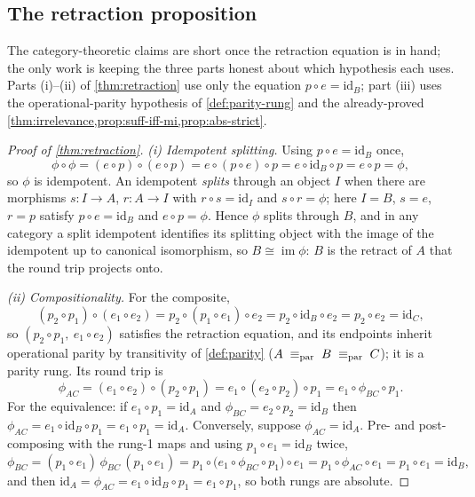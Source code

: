 \subsection{The retraction proposition}
\label{app:retraction}

The category-theoretic claims are short once the retraction equation is in
hand; the only work is keeping the three parts honest about which hypothesis
each uses. Parts (i)--(ii) of \cref{thm:retraction} use only the equation
$p\circ e=\mathrm{id}_B$; part (iii) uses the operational-parity hypothesis of
\cref{def:parity-rung} and the already-proved \cref{thm:irrelevance,prop:suff-iff-mi,prop:abs-strict}.

\begin{proof}[Proof of \cref{thm:retraction}]
\emph{(i) Idempotent splitting.} Using $p\circ e=\mathrm{id}_B$ once,
\[
  \phi\circ\phi
  = (e\circ p)\circ(e\circ p)
  = e\circ(p\circ e)\circ p
  = e\circ\mathrm{id}_B\circ p
  = e\circ p
  = \phi,
\]
so $\phi$ is idempotent. An idempotent \emph{splits} through an object $I$ when
there are morphisms $s:I\to A$, $r:A\to I$ with $r\circ s=\mathrm{id}_I$ and
$s\circ r=\phi$; here $I=B$, $s=e$, $r=p$ satisfy $p\circ e=\mathrm{id}_B$ and
$e\circ p=\phi$. Hence $\phi$ splits through $B$, and in any category a split
idempotent identifies its splitting object with the image of the idempotent up
to canonical isomorphism, so $B\cong\operatorname{im}\phi$: $B$ is the retract
of $A$ that the round trip projects onto.

\emph{(ii) Compositionality.} For the composite,
\[
  (p_2\circ p_1)\circ(e_1\circ e_2)
  = p_2\circ(p_1\circ e_1)\circ e_2
  = p_2\circ\mathrm{id}_B\circ e_2
  = p_2\circ e_2
  = \mathrm{id}_C,
\]
so $(p_2\circ p_1,\ e_1\circ e_2)$ satisfies the retraction equation, and its
endpoints inherit operational parity by transitivity of \cref{def:parity}
($A\;\equiv_{\mathrm{par}}\; B\;\equiv_{\mathrm{par}}\; C$); it is a parity rung. Its round trip is
\[
  \phi_{AC}
  = (e_1\circ e_2)\circ(p_2\circ p_1)
  = e_1\circ(e_2\circ p_2)\circ p_1
  = e_1\circ\phi_{BC}\circ p_1 .
\]
For the equivalence: if $e_1\circ p_1=\mathrm{id}_A$ and
$\phi_{BC}=e_2\circ p_2=\mathrm{id}_B$ then
$\phi_{AC}=e_1\circ\mathrm{id}_B\circ p_1=e_1\circ p_1=\mathrm{id}_A$.
Conversely, suppose $\phi_{AC}=\mathrm{id}_A$. Pre- and post-composing with the
rung-1 maps and using $p_1\circ e_1=\mathrm{id}_B$ twice,
\[
  \phi_{BC}
  = (p_1\circ e_1)\,\phi_{BC}\,(p_1\circ e_1)
  = p_1\circ\big(e_1\circ\phi_{BC}\circ p_1\big)\circ e_1
  = p_1\circ\phi_{AC}\circ e_1
  = p_1\circ e_1
  = \mathrm{id}_B,
\]
and then $\mathrm{id}_A=\phi_{AC}=e_1\circ\mathrm{id}_B\circ p_1=e_1\circ p_1$,
so both rungs are absolute.


\end{proof}
